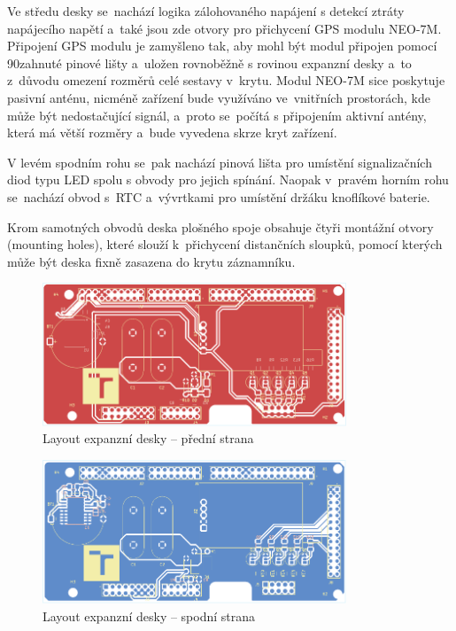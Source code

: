 Ve středu desky se~nachází logika zálohovaného napájení s detekcí ztráty napájecího napětí a~také jsou zde otvory pro přichycení GPS modulu NEO-7M. Připojení GPS modulu je zamyšleno tak, aby mohl být modul připojen pomocí 90\textdegree zahnuté pinové lišty a~uložen rovnoběžně s rovinou expanzní desky a~to z~důvodu omezení rozměrů celé sestavy v~krytu. Modul NEO-7M sice poskytuje pasivní anténu, nicméně zařízení bude využíváno ve~vnitřních prostorách, kde může být nedostačující signál, a~proto se~počítá s připojením aktivní antény, která má větší rozměry a~bude vyvedena skrze kryt zařízení. 

V levém spodním rohu se~pak nachází pinová lišta pro umístění signalizačních diod typu LED spolu s obvody pro jejich spínání. Naopak v~pravém horním rohu se~nachází obvod s~RTC a~vývrtkami pro umístění držáku knoflíkové baterie.

Krom samotných obvodů deska plošného spoje obsahuje čtyři montážní otvory (mounting holes), které slouží k~přichycení distančních sloupků, pomocí kterých může být deska fixně zasazena do krytu záznamníku.

\begin{figure}[h]
    \centering
    \includegraphics[width=0.81\textwidth]{obrazky-figures/extension_shield-brd-front.pdf}
    
    \caption{Layout expanzní desky -- přední strana}
    \label{fig:layout-front}
\end{figure}

\begin{figure}[h]
    \centering
    \includegraphics[width=0.81\textwidth]{obrazky-figures/extension_shield-brd-back.pdf}
    
    \caption{Layout expanzní desky -- spodní strana}
    \label{fig:layout-back}
\end{figure}

